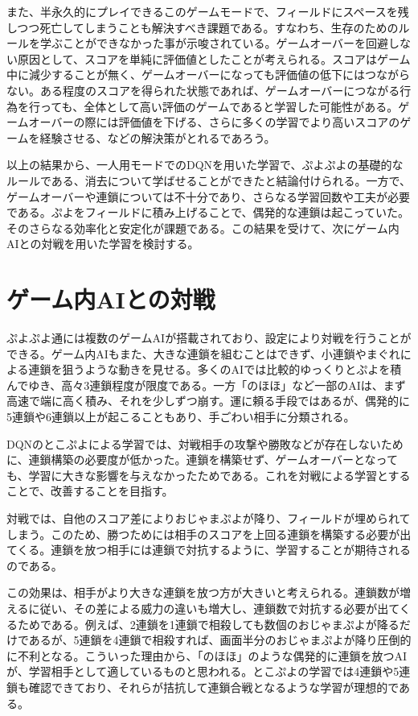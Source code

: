 \documentclass[12pt]{jsarticle}
\begin{document}
また、半永久的にプレイできるこのゲームモードで、フィールドにスペースを残しつつ死亡してしまうことも解決すべき課題である。すなわち、生存のためのルールを学ぶことができなかった事が示唆されている。ゲームオーバーを回避しない原因として、スコアを単純に評価値としたことが考えられる。スコアはゲーム中に減少することが無く、ゲームオーバーになっても評価値の低下にはつながらない。ある程度のスコアを得られた状態であれば、ゲームオーバーにつながる行為を行っても、全体として高い評価のゲームであると学習した可能性がある。ゲームオーバーの際には評価値を下げる、さらに多くの学習でより高いスコアのゲームを経験させる、などの解決策がとれるであろう。

以上の結果から、一人用モードでのDQNを用いた学習で、ぷよぷよの基礎的なルールである、消去について学ばせることができたと結論付けられる。一方で、ゲームオーバーや連鎖については不十分であり、さらなる学習回数や工夫が必要である。ぷよをフィールドに積み上げることで、偶発的な連鎖は起こっていた。そのさらなる効率化と安定化が課題である。この結果を受けて、次にゲーム内AIとの対戦を用いた学習を検討する。


\section{ゲーム内AIとの対戦}
ぷよぷよ通には複数のゲームAIが搭載されており、設定により対戦を行うことができる。ゲーム内AIもまた、大きな連鎖を組むことはできず、小連鎖やまぐれによる連鎖を狙うような動きを見せる。多くのAIでは比較的ゆっくりとぷよを積んでゆき、高々3連鎖程度が限度である。一方「のほほ」など一部のAIは、まず高速で端に高く積み、それを少しずつ崩す。運に頼る手段ではあるが、偶発的に5連鎖や6連鎖以上が起こることもあり、手ごわい相手に分類される。

DQNのとこぷよによる学習では、対戦相手の攻撃や勝敗などが存在しないために、連鎖構築の必要度が低かった。連鎖を構築せず、ゲームオーバーとなっても、学習に大きな影響を与えなかったためである。これを対戦による学習とすることで、改善することを目指す。

対戦では、自他のスコア差によりおじゃまぷよが降り、フィールドが埋められてしまう。このため、勝つためには相手のスコアを上回る連鎖を構築する必要が出てくる。連鎖を放つ相手には連鎖で対抗するように、学習することが期待されるのである。

この効果は、相手がより大きな連鎖を放つ方が大きいと考えられる。連鎖数が増えるに従い、その差による威力の違いも増大し、連鎖数で対抗する必要が出てくるためである。例えば、2連鎖を1連鎖で相殺しても数個のおじゃまぷよが降るだけであるが、5連鎖を4連鎖で相殺すれば、画面半分のおじゃまぷよが降り圧倒的に不利となる。こういった理由から、「のほほ」のような偶発的に連鎖を放つAIが、学習相手として適しているものと思われる。とこぷよの学習では4連鎖や5連鎖も確認できており、それらが拮抗して連鎖合戦となるような学習が理想的である。
\end{document}
